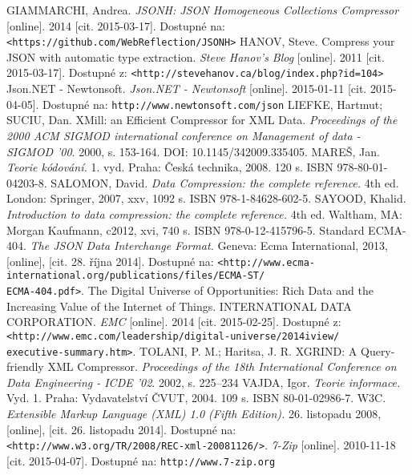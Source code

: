 \begin{thebibliography}{99}
 GIAMMARCHI, Andrea. {\em JSONH: JSON Homogeneous Collections Compressor} [online]. 2014 [cit. 2015-03-17]. Dostupné na: {\tt <https://github.com/WebReflection/JSONH>}
 HANOV, Steve. Compress your JSON with automatic type extraction. {\em Steve Hanov's Blog} [online]. 2011 [cit. 2015-03-17]. Dostupné z: {\tt <http://stevehanov.ca/blog/index.php?id=104>}
 Json.NET - Newtonsoft. {\em Json.NET - Newtonsoft} [online]. 2015-01-11 [cit. 2015-04-05]. Dostupné na: {\tt http://www.newtonsoft.com/json}
 LIEFKE, Hartmut; SUCIU, Dan. XMill: an Efficient Compressor for XML Data. {\em Proceedings of the 2000 ACM SIGMOD international conference on Management of data - SIGMOD '00}. 2000, s. 153-164. DOI: 10.1145/342009.335405.
 MAREŠ, Jan. {\em Teorie kódování.} 1. vyd. Praha: Česká technika, 2008. 120 s. ISBN 978-80-01-04203-8.
 SALOMON, David. {\em Data Compression: the complete reference.} 4th ed. London: Springer, 2007, xxv, 1092 s. ISBN 978-1-84628-602-5.
	SAYOOD, Khalid. {\em Introduction to data compression: the complete reference.} 4th ed. Waltham, MA: Morgan Kaufmann, c2012, xvi, 740 s. ISBN 978-0-12-415796-5.
 Standard ECMA-404. {\em The JSON Data Interchange Format.} Geneva: Ecma International, 2013, [online], [cit. 28. října 2014]. Dostupné na: {\tt <http://www.ecma-international.org/publications/files/ECMA-ST/\\ECMA-404.pdf>}.
 The Digital Universe of Opportunities: Rich Data and the Increasing Value of the Internet of Things. INTERNATIONAL DATA CORPORATION. {\em EMC} [online]. 2014 [cit. 2015-02-25]. Dostupné z: {\tt <http://www.emc.com/leadership/digital-universe/2014iview/\\executive-summary.htm>}.
 TOLANI, P. M.; Haritsa, J. R. XGRIND: A Query-friendly XML Compressor. {\em Proceedings of the 18th International Conference on Data Engineering - ICDE ’02}. 2002, s. 225--234
 VAJDA, Igor. {\em Teorie informace.} Vyd. 1. Praha: Vydavatelství ČVUT, 2004. 109 s. ISBN 80-01-02986-7.
 W3C. {\em Extensible Markup Language (XML) 1.0 (Fifth Edition).} 26. listopadu 2008, [online], [cit. 26. listopadu 2014]. Dostupné na: {\tt <http://www.w3.org/TR/2008/REC-xml-20081126/>}.
 {\em 7-Zip} [online]. 2010-11-18 [cit. 2015-04-07]. Dostupné na: {\tt http://www.7-zip.org}

\end{thebibliography}
